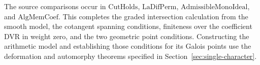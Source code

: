 The source comparisons occur in \(\mathrm{CutHolds}\),
\(\mathrm{LaDifPerm}\), \(\mathrm{AdmissibleMonoIdeal}\), and
\(\mathrm{AlgMemCoef}\). This completes the graded intersection
calculation from the smooth model, the cotangent spanning conditions,
finiteness over the coefficient DVR in weight zero, and the two
geometric point conditions. Constructing the arithmetic model and
establishing those conditions for its Galois points use the
deformation and automorphy theorems specified in
Section~\ref{sec:single-character}.
